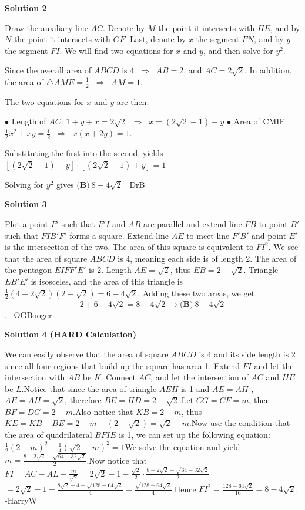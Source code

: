 \begin{enumerate}
\textbf{Solution 2}

Draw the auxiliary line $AC$. Denote by $M$ the point it intersects with $HE$, and by $N$ the point it intersects with $GF$. Last, denote by $x$ the segment $FN$, and by $y$ the segment $FI$. We will find two equations for $x$ and $y$, and then solve for $y^2$. 

 Since the overall area of $ABCD$ is $4 \;\; \Longrightarrow \;\;  AB=2$, and $AC=2\sqrt{2}$. In addition, the area of $\bigtriangleup AME = \frac{1}{2} \;\; \Longrightarrow \;\; AM=1$.

 The two equations for $x$ and $y$ are then:

 $\bullet$ Length of $AC$: $1+y+x = 2\sqrt{2}  \;\; \Longrightarrow \;\; x = (2\sqrt{2}-1) - y$
$\bullet$ Area of CMIF: $\frac{1}{2}x^2+xy = \frac{1}{2}  \;\; \Longrightarrow \;\; x(x+2y)=1$.

 Substituting the first into the second, yields $\left[\left(2\sqrt{2}-1\right)-y\right]\cdot \left[\left(2\sqrt{2}-1\right)+y\right]=1$

 Solving for $y^2$ gives $\boxed{\textbf{(B)}\ 8-4\sqrt{2}}$ ~DrB

 



\textbf{Solution 3}

Plot a point $F'$ such that $F'I$ and $AB$ are parallel and extend line $FB$ to point $B'$ such that $FIB'F'$ forms a square. Extend line $AE$ to meet line $F'B'$ and point $E'$ is the intersection of the two. The area of this square is equivalent to $FI^2$. We see that the area of square $ABCD$ is $4$, meaning each side is of length 2. The area of the pentagon $EIFF'E'$ is $2$. Length $AE=\sqrt{2}$, thus $EB=2-\sqrt{2}$. Triangle $EB'E'$ is isosceles, and the area of this triangle is $\frac{1}{2}(4-2\sqrt{2})(2-\sqrt{2})=6-4\sqrt{2}$. Adding these two areas, we get 
 \[2+6-4\sqrt{2}=8-4\sqrt{2}\rightarrow \boxed{\textbf{(B)}\ 8-4\sqrt{2}}\]. --OGBooger

 



\textbf{Solution 4 (HARD Calculation)}

We can easily observe that the area of square $ABCD$ is 4 and its side length is 2 since all four regions that build up the square has area 1. Extend $FI$ and let the intersection with $AB$ be $K$. Connect $AC$, and let the intersection of $AC$ and $HE$ be $L$.Notice that since the area of triangle $AEH$ is 1 and $AE=AH$ , $AE=AH=\sqrt{2}$, therefore $BE=HD=2-\sqrt{2}$.Let $CG=CF=m$, then $BF=DG=2-m$.Also notice that $KB=2-m$, thus $KE=KB-BE=2-m-(2-\sqrt{2})=\sqrt{2}-m$.Now use the condition that the area of quadrilateral $BFIE$ is 1, we can set up the following equation: $\frac{1}{2}(2-m)^2-\frac{1}{4}(\sqrt{2}-m)^2=1$We solve the equation and yield $m=\frac{8-2\sqrt{2}-\sqrt{64-32\sqrt{2}}}{2}$.Now notice that$FI=AC-AL-\frac{m}{\sqrt{2}}=2\sqrt{2}-1-\frac{\sqrt{2}}{2} \cdot \frac{8-2\sqrt{2}-\sqrt{64-32\sqrt{2}}}{2}$$=2\sqrt{2}-1-\frac{8\sqrt{2}-4-\sqrt{128-64\sqrt2}}{4}$$=\frac{\sqrt{128-64\sqrt{2}}}{4}$.Hence $FI^2=\frac{128-64\sqrt{2}}{16}=8-4\sqrt{2}$.  -HarryW


\end{enumerate}
